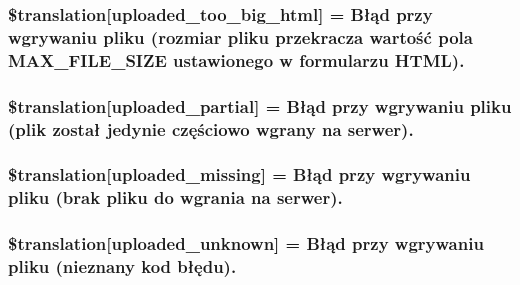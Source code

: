 \subsubsection[{\$translation}]{\setlength{\rightskip}{0pt plus 5cm}\$translation\mbox{[}\textquotesingle{}uploaded\+\_\+too\+\_\+big\+\_\+html\textquotesingle{}\mbox{]} = \textquotesingle{}Błąd przy wgrywaniu pliku (rozmiar pliku przekracza wartość pola M\+A\+X\+\_\+\+F\+I\+L\+E\+\_\+\+S\+I\+Z\+E ustawionego w formularzu H\+T\+M\+L).\textquotesingle{}}\label{class_8upload_8pl___p_l_8php_a623d5b8b92169f57d7e43458aa911cbb}
\hypertarget{class_8upload_8pl___p_l_8php_a967c17da21b0a2d3bd65cca3a9ca0ea8}{}
\subsubsection[{\$translation}]{\setlength{\rightskip}{0pt plus 5cm}\$translation\mbox{[}\textquotesingle{}uploaded\+\_\+partial\textquotesingle{}\mbox{]} = \textquotesingle{}Błąd przy wgrywaniu pliku (plik został jedynie częściowo wgrany na serwer).\textquotesingle{}}\label{class_8upload_8pl___p_l_8php_a967c17da21b0a2d3bd65cca3a9ca0ea8}
\hypertarget{class_8upload_8pl___p_l_8php_a0cce433260be65f1f35853a6b4b8952b}{}
\subsubsection[{\$translation}]{\setlength{\rightskip}{0pt plus 5cm}\$translation\mbox{[}\textquotesingle{}uploaded\+\_\+missing\textquotesingle{}\mbox{]} = \textquotesingle{}Błąd przy wgrywaniu pliku (brak pliku do wgrania na serwer).\textquotesingle{}}\label{class_8upload_8pl___p_l_8php_a0cce433260be65f1f35853a6b4b8952b}
\hypertarget{class_8upload_8pl___p_l_8php_a4a9168e922b827e6a28b5db1c00774ca}{}
\subsubsection[{\$translation}]{\setlength{\rightskip}{0pt plus 5cm}\$translation\mbox{[}\textquotesingle{}uploaded\+\_\+unknown\textquotesingle{}\mbox{]} = \textquotesingle{}Błąd przy wgrywaniu pliku (nieznany kod błędu).\textquotesingle{}}\label{class_8upload_8pl___p_l_8php_a4a9168e922b827e6a28b5db1c00774ca}
\hypertarget{class_8upload_8pl___p_l_8php_a3afc377bd803683314f413a814243066}{}
